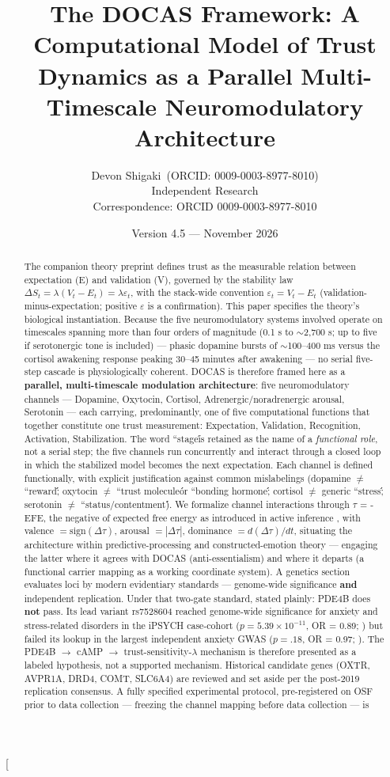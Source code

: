 \documentclass[11pt,twocolumn]{article}
\title{The DOCAS Framework: A Computational Model of Trust Dynamics as a Parallel Multi-Timescale Neuromodulatory Architecture}
\author{Devon Shigaki~(ORCID: 0009-0003-8977-8010)\\
\small Independent Research\\
\small Correspondence: ORCID 0009-0003-8977-8010}
\date{\small Version 4.5 --- November 2026}
\theoremstyle{plain}
\begin{document}
\twocolumn[{%
\maketitle
\begin{abstract}
The companion theory preprint defines trust as the measurable relation between expectation (E) and validation (V), governed by the stability law $\Delta S_t = \lambda(V_t - E_t) = \lambda\varepsilon_t$, with the stack-wide convention $\varepsilon_t = V_t - E_t$ (validation-minus-expectation; positive $\varepsilon$ is a confirmation). This paper specifies the theory's biological instantiation. Because the five neuromodulatory systems involved operate on timescales spanning more than four orders of magnitude (0.1 s to $\sim$2,700 s; up to five if serotonergic tone is included) — phasic dopamine bursts of $\sim$100–400 ms versus the cortisol awakening response peaking 30–45 minutes after awakening — no serial five-step cascade is physiologically coherent. DOCAS is therefore framed here as a \textbf{parallel, multi-timescale modulation architecture}: five neuromodulatory channels — Dopamine, Oxytocin, Cortisol, Adrenergic/noradrenergic arousal, Serotonin — each carrying, predominantly, one of five computational functions that together constitute one trust measurement: Expectation, Validation, Recognition, Activation, Stabilization. The word ``stage\'\' is retained as the name of a \textit{functional role}, not a serial step; the five channels run concurrently and interact through a closed loop in which the stabilized model becomes the next expectation. Each channel is defined functionally, with explicit justification against common mislabelings (dopamine $\neq$ ``reward\'\'; oxytocin $\neq$ ``trust molecule\'\' or ``bonding hormone\'\'; cortisol $\neq$ generic ``stress\'\'; serotonin $\neq$ ``status/contentment\'\'). We formalize channel interactions through $\tau$ = -EFE, the negative of expected free energy as introduced in active inference \citep{friston2015,friston2017}, with valence $= \mathrm{sign}(\Delta\tau)$, arousal $= |\Delta\tau|$, dominance $= d(\Delta\tau)/dt$, situating the architecture within predictive-processing and constructed-emotion theory — engaging the latter where it agrees with DOCAS (anti-essentialism) and where it departs (a functional carrier mapping as a working coordinate system). A genetics section evaluates loci by modern evidentiary standards — genome-wide significance \textbf{and} independent replication. Under that two-gate standard, stated plainly: PDE4B does \textbf{not} pass. Its lead variant rs7528604 reached genome-wide significance for anxiety and stress-related disorders in the iPSYCH case-cohort ($p = 5.39 \times 10^{-11}$, OR = 0.89; \citealp{meier2019}) but failed its lookup in the largest independent anxiety GWAS ($p = .18$, OR = 0.97; \citealp{purves2020}). The PDE4B $\to$ cAMP $\to$ trust-sensitivity-$\lambda$ mechanism is therefore presented as a labeled hypothesis, not a supported mechanism. Historical candidate genes (OXTR, AVPR1A, DRD4, COMT, SLC6A4) are reviewed and set aside per the post-2019 replication consensus. A fully specified experimental protocol, pre-registered on OSF prior to data collection — freezing the channel mapping before data collection — is 
\end{abstract}}
\end{document}
